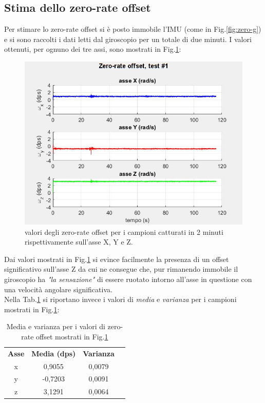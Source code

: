 \subsection{Stima dello zero-rate offset}
\label{zero_rate}
Per stimare lo zero-rate offset si è posto immobile l'IMU (come in Fig.\ref{fig:zero-g}) e si sono raccolti i dati letti dal giroscopio per un totale di due minuti. I valori ottenuti, per ognuno dei tre assi, sono mostrati in Fig.\ref{fig:zero-rate}:
\begin{figure}[H]  
	\centering 
	\includegraphics[scale=0.6]{analisi/zero-rate.jpg}
	\caption{valori degli zero-rate offset per i campioni catturati in 2 minuti rispettivamente sull'asse X, Y e Z.}
	\label{fig:zero-rate}
\end{figure}
Dai valori mostrati in Fig.\ref{fig:zero-rate} si evince facilmente la presenza di un offset significativo sull'asse Z da cui ne consegue che, pur rimanendo immobile il giroscopio ha \textit{"la sensazione"} di essere ruotato intorno all'asse in questione con una velocità angolare significativa.\\
Nella Tab.\ref{tab:zero-rate} si riportano invece i valori di \textit{media} e \textit{varianza} per i campioni mostrati in Fig.\ref{fig:zero-rate}:
\begin{table}[H]
	\centering
	\label{tab:zero-rate}
	\begin{tabular}{|c|c|c|l}
		\cline{1-3}
		\textbf{Asse} & \multicolumn{1}{l|}{\textbf{Media (dps)}} & \multicolumn{1}{l|}{\textbf{Varianza}} &  \\ \cline{1-3}
		x             & 0,9055                                    & 0,0079                                 &  \\ \cline{1-3}
		y             & -0,7203                                   & 0,0091                                 &  \\ \cline{1-3}
		z             & 3,1291                                    & 0,0064                                 &  \\ \cline{1-3}
	\end{tabular}
	\caption{Media e varianza per i valori di zero-rate offset mostrati in Fig.\ref{fig:zero-rate}}
\end{table}

